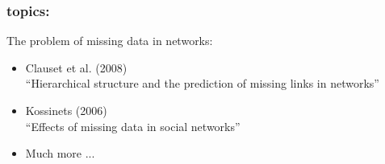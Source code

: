 \begin{frame}
  \frametitle{topics:}

  \begin{block}{The problem of missing data in networks:}
    \begin{itemize}
    \item 
      Clauset et al. (2008)\\
      ``Hierarchical structure and the prediction of missing links in networks''\cite{clauset2008a}
    \item 
      Kossinets (2006)\\
      ``Effects of missing data in social networks''\cite{kossinets2006b}
    \item 
      Much more ...
    \end{itemize}
  \end{block}

\end{frame}




